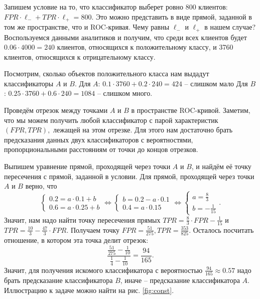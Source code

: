 \documentclass[12pt,a4paper]{article}
\begin{document}
\begin{esSolution}
Запишем условие на то, что классификатор выберет ровно 800 клиентов: $FPR \cdot \ell_{-} + TPR \cdot \ell_{+} = 800.$
Это можно представить в виде прямой, заданной в том же пространстве, что и ROC-кривая.
Чему равны $\ell_{-}$ и $\ell_{+}$ в нашем случае?
Воспользуемся данными аналитиков и получим, что среди всех клиентов будет $0.06 \cdot 4000 = 240$ клиентов, относящихся к положительному классу, и 3760 клиентов, относящихся к отрицательному классу.

Посмотрим, сколько объектов положительного класса нам выдадут классификаторы $A$ и $B$.
Для $A$: $0.1 \cdot 3760 + 0.2 \cdot 240 = 424$ -- слишком мало
Для $B$: $0.25 \cdot 3760 + 0.6 \cdot 240 = 1084$ -- слишком много.

Проведём отрезок между точками $A$ и $B$ в пространстве ROC-кривой.
Заметим, что мы можем получить любой классификатор с парой характеристик $(FPR, TPR),$ лежащей на этом отрезке.
Для этого нам достаточно брать предсказания данных двух классификаторов с вероятностями, пропорциональными расстояниям от точки до концов отрезков.

Выпишем уравнение прямой, проходящей через точки $A$ и $B$, и найдём её точку пересечения с прямой, заданной в условии.
Для прямой, проходящей через точки $A$ и $B$ верно, что 
$$
\begin{cases}
    0.2 = a \cdot 0.1 + b\\
    0.6 = a \cdot 0.25 + b
\end{cases}
\Leftrightarrow 
\begin{cases}
    b = 0.2 - a \cdot 0.1\\
    0.4 = a \cdot 0.15
\end{cases}\Leftrightarrow \begin{cases}
    a = \frac{8}{3}\\
    b = -\frac{1}{15}
\end{cases}.
$$
Значит, нам надо найти точку пересечения прямых $TPR = \frac{8}{3} \cdot FPR - \frac{1}{15}$ и $TPR = \frac{10}{3} - \frac{47}{3} \cdot FPR.$ Получаем точку $FPR = \frac{51}{275}, TPR = \frac{353}{825}.$
Осталось посчитать отношение, в котором эта точка делит отрезок:
$$\frac{\frac{51}{275} - \frac{1}{10}}{\frac{1}{4} - \frac{1}{10}} = \frac{94}{165}.$$
Значит, для получения искомого классификатора с вероятностью $\frac{94}{165} \approx 0.57$ надо брать предсказание классификатора $B$, иначе -- предсказание классификатора $A$.
Иллюстрацию к задаче можно найти на рис. \ref{fig:const}.


\end{esSolution}
\end{document}
